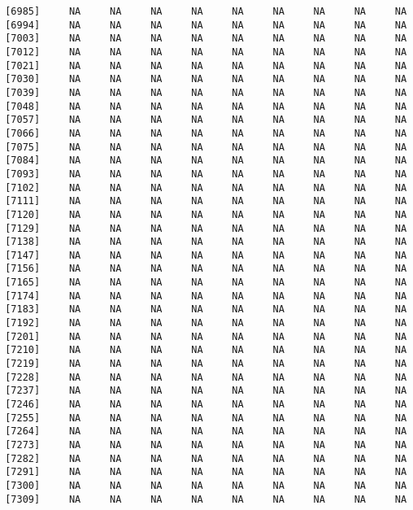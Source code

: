 \documentclass[]{article}
\begin{document}
\begin{verbatim}
 [6985]     NA     NA     NA     NA     NA     NA     NA     NA     NA
 [6994]     NA     NA     NA     NA     NA     NA     NA     NA     NA
 [7003]     NA     NA     NA     NA     NA     NA     NA     NA     NA
 [7012]     NA     NA     NA     NA     NA     NA     NA     NA     NA
 [7021]     NA     NA     NA     NA     NA     NA     NA     NA     NA
 [7030]     NA     NA     NA     NA     NA     NA     NA     NA     NA
 [7039]     NA     NA     NA     NA     NA     NA     NA     NA     NA
 [7048]     NA     NA     NA     NA     NA     NA     NA     NA     NA
 [7057]     NA     NA     NA     NA     NA     NA     NA     NA     NA
 [7066]     NA     NA     NA     NA     NA     NA     NA     NA     NA
 [7075]     NA     NA     NA     NA     NA     NA     NA     NA     NA
 [7084]     NA     NA     NA     NA     NA     NA     NA     NA     NA
 [7093]     NA     NA     NA     NA     NA     NA     NA     NA     NA
 [7102]     NA     NA     NA     NA     NA     NA     NA     NA     NA
 [7111]     NA     NA     NA     NA     NA     NA     NA     NA     NA
 [7120]     NA     NA     NA     NA     NA     NA     NA     NA     NA
 [7129]     NA     NA     NA     NA     NA     NA     NA     NA     NA
 [7138]     NA     NA     NA     NA     NA     NA     NA     NA     NA
 [7147]     NA     NA     NA     NA     NA     NA     NA     NA     NA
 [7156]     NA     NA     NA     NA     NA     NA     NA     NA     NA
 [7165]     NA     NA     NA     NA     NA     NA     NA     NA     NA
 [7174]     NA     NA     NA     NA     NA     NA     NA     NA     NA
 [7183]     NA     NA     NA     NA     NA     NA     NA     NA     NA
 [7192]     NA     NA     NA     NA     NA     NA     NA     NA     NA
 [7201]     NA     NA     NA     NA     NA     NA     NA     NA     NA
 [7210]     NA     NA     NA     NA     NA     NA     NA     NA     NA
 [7219]     NA     NA     NA     NA     NA     NA     NA     NA     NA
 [7228]     NA     NA     NA     NA     NA     NA     NA     NA     NA
 [7237]     NA     NA     NA     NA     NA     NA     NA     NA     NA
 [7246]     NA     NA     NA     NA     NA     NA     NA     NA     NA
 [7255]     NA     NA     NA     NA     NA     NA     NA     NA     NA
 [7264]     NA     NA     NA     NA     NA     NA     NA     NA     NA
 [7273]     NA     NA     NA     NA     NA     NA     NA     NA     NA
 [7282]     NA     NA     NA     NA     NA     NA     NA     NA     NA
 [7291]     NA     NA     NA     NA     NA     NA     NA     NA     NA
 [7300]     NA     NA     NA     NA     NA     NA     NA     NA     NA
 [7309]     NA     NA     NA     NA     NA     NA     NA     NA     NA

\end{verbatim}
\end{document}
